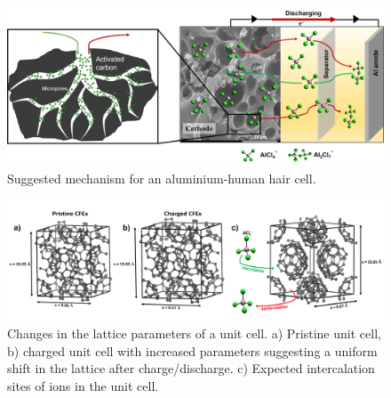 \documentclass{article}
\begin{document}
 \begin{figure}[tbh!]
  \centering
  \includegraphics[width=\textwidth]{figures/ACHmech}
    \caption{Suggested mechanism for an aluminium-human hair cell.}
  \label{figures:ACHmech}
\end{figure}

\begin{figure}[tbh!]
  \centering
  \includegraphics[width=\textwidth]{figures/CFExcryst}
    \caption{Changes in the lattice parameters of a  unit cell. a) Pristine unit cell, b) charged unit cell with increased parameters suggesting a uniform shift in the lattice after charge/discharge. c) Expected intercalation sites of  ions in the unit cell.}
  \label{figures:CFExcryst}
\end{figure}

\end{document}
